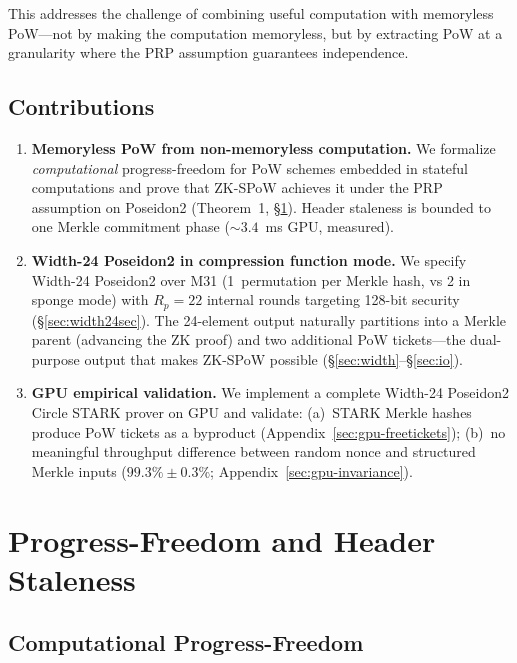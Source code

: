 \documentclass[11pt,a4paper]{article}
\begin{document}
This addresses the challenge of combining useful computation with memoryless PoW---not by making the computation memoryless, but by extracting PoW at a granularity where the PRP assumption guarantees independence.

\subsection{Contributions}
\label{sec:contributions}

\begin{enumerate}
\item \textbf{Memoryless PoW from non-memoryless computation.} We formalize \emph{computational} progress-freedom for PoW schemes embedded in stateful computations and prove that ZK-SPoW achieves it under the PRP assumption on Poseidon2 (Theorem~1, \S\ref{sec:progress}). Header staleness is bounded to one Merkle commitment phase (${\sim}3.4$~ms GPU, measured).

\item \textbf{Width-24 Poseidon2 in compression function mode.} We specify Width-24 Poseidon2 over M31 (1~permutation per Merkle hash, vs 2 in sponge mode) with $R_p = 22$ internal rounds targeting 128-bit security (\S\ref{sec:width24sec}). The 24-element output naturally partitions into a Merkle parent (advancing the ZK proof) and two additional PoW tickets---the dual-purpose output that makes ZK-SPoW possible (\S\ref{sec:width}--\S\ref{sec:io}).

\item \textbf{GPU empirical validation.} We implement a complete Width-24 Poseidon2 Circle STARK prover on GPU and validate: (a)~STARK Merkle hashes produce PoW tickets as a byproduct (Appendix~\ref{sec:gpu-freetickets}); (b)~no meaningful throughput difference between random nonce and structured Merkle inputs ($99.3\% \pm 0.3\%$; Appendix~\ref{sec:gpu-invariance}).
\end{enumerate}

\section{Progress-Freedom and Header Staleness}
\label{sec:progress}

\subsection{Computational Progress-Freedom}
\label{sec:comp-progress}
\end{document}

